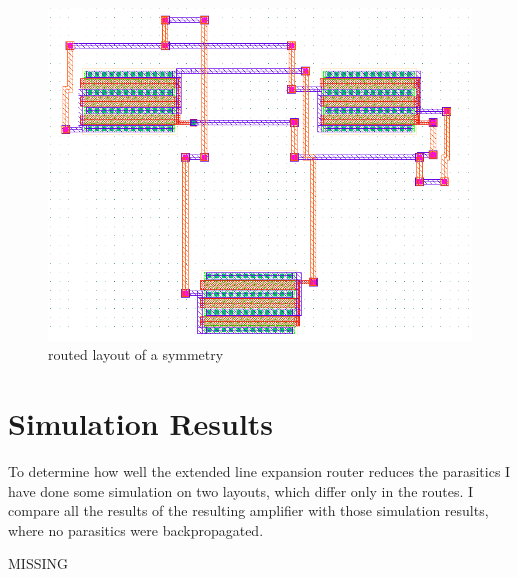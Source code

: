 \begin{figure}
	\centering
	\includegraphics[scale=.6]{FIG/symmetry_routed.png}
  	\caption{routed layout of a symmetry}
	\label{fig:symmetry_routed}
\end{figure}

\section{Simulation Results}
To determine how well the extended line expansion router reduces the parasitics I have done some simulation on two layouts, which differ only in the routes. I compare all the results of the resulting amplifier with those simulation results, where no parasitics were backpropagated.

MISSING